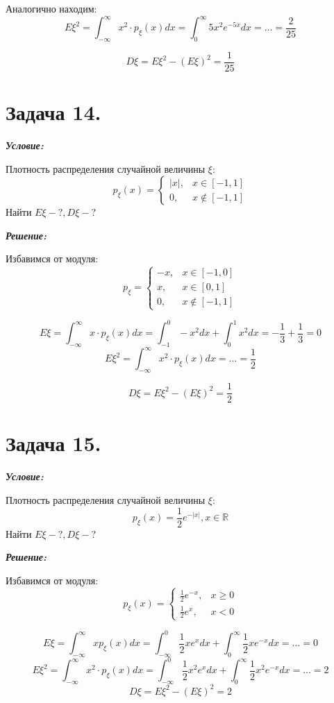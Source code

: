 Аналогично находим:
\[
E\xi^2 = \int_{-\infty}^{\infty} x^2 \cdot p_{\xi} (x) dx = \int_{0}^{\infty} 5x^2e^{-5x}dx = \dots = \frac{2}{25}
\]

\[
D\xi = E\xi^2 - (E\xi)^2 = \frac{1}{25}
\]

\section*{Задача 14.}

\noindent\textit{\textbf{Условие:}}

Плотность распределения случайной величины $\xi$:
\[
p_{\xi} (x) =
\begin{cases}
|x|, &x \in [-1, 1] \\
0, &x \notin [-1, 1]
\end{cases}
\]
Найти $E\xi - ?, D\xi - ?$

\noindent\textit{\textbf{Решение:}}

Избавимся от модуля:
\[
p_{\xi} =
\begin{cases}
-x, & x \in [-1, 0] \\
x, &x \in [0, 1] \\
0, &x \notin [-1, 1]
\end{cases}
\]

\[
E\xi = \int_{-\infty}^{\infty} x \cdot p_{\xi} (x) dx = \int_{-1}^{0} -x^2 dx + \int_{0}^{1} x^2 dx = - \frac{1}{3} + \frac{1}{3} = 0
\]
\[
E\xi^2 = \int_{-\infty}^{\infty} x^2 \cdot p_{\xi} (x) dx = \dots = \frac{1}{2}
\]

\[
D\xi = E\xi^2 - (E\xi)^2 = \frac{1}{2}
\]

\section*{Задача 15.}

\noindent\textit{\textbf{Условие:}}

Плотность распределения случайной величины $\xi$:
\[
p_{\xi} (x) = \frac{1}{2} e^{-|x|}, x \in \mathbb{R}
\]
Найти $E\xi - ?, D\xi - ?$

\noindent\textit{\textbf{Решение:}}

Избавимся от модуля:
\[
p_{\xi}(x) =
\begin{cases}
\frac{1}{2} e^{-x}, &x \ge 0 \\
\frac{1}{2} e^x, &x < 0
\end{cases}
\]

\[
E\xi = \int_{-\infty}^{\infty} x p_{\xi} (x) dx = \int_{-\infty}^{0} \frac{1}{2} x e^x dx + \int_{0}^{\infty} \frac{1}{2} x e^{-x} dx = \dots = 0
\]
\[
E\xi^2 = \int_{-\infty}^{\infty} x^2 \cdot p_{\xi}(x) dx = \int_{-\infty}^{0} \frac{1}{2} x^2 e^x dx + \int_{0}^{\infty} \frac{1}{2} x^2 e^{-x} dx = \dots = 2
\]
\[
D\xi = E\xi^2 - (E\xi)^2 = 2
\]

